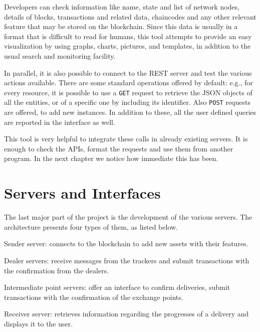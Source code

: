 Developers can check information like name, state and list of network nodes, details of blocks, transactions and related data, chaincodes and any other relevant feature that may be stored on the blockchain. Since this data is usually in a format that is difficult to read for humans, this tool attempts to provide an easy visualization by using graphs, charts, pictures, and templates, in addition to the usual search and monitoring facility.

In parallel, it is also possible to connect to the REST server and test the various actions available. There are some standard operations offered by default: e.g., for every resource, it is possible to use a \texttt{GET} request to retrieve the JSON objects of all the entities, or of a specific one by including its identifier. Also \texttt{POST} requests are offered, to add new instances. In addition to these, all the user defined queries are reported in the interface as well.

This tool is very helpful to integrate these calls in already existing servers. It is enough to check the APIs, format the requests and use them from another program. In the next chapter we notice how immediate this has been.


\chapter{Servers and Interfaces}
\label{cha:servers}
The last major part of the project is the development of the various servers. The architecture presents four types of them, as listed below.

\begin{description}
    \item Sender server: connects to the blockchain to add new assets with their features.
    \item Dealer servers: receive messages from the trackers and submit transactions with the confirmation from the dealers.
    \item Intermediate point servers: offer an interface to confirm deliveries, submit transactions with the confirmation of the exchange points.
    \item Receiver server: retrieves information regarding the progresses of a delivery and displays it to the user.
\end{description}

